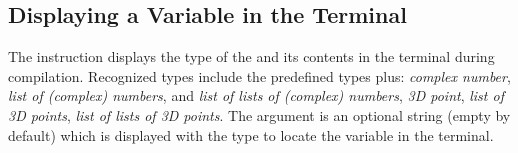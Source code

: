 \subsection{Displaying a Variable in the Terminal}

The instruction  displays the type of the  and its contents in the terminal during compilation. Recognized types include the predefined types plus: \emph{complex number}, \emph{list of (complex) numbers}, and \emph{list of lists of (complex) numbers},  \emph{3D point}, \emph{list of 3D points}, \emph{list of lists of 3D points}. The argument  is an optional string (empty by default) which is displayed with the type to locate the variable in the terminal.
